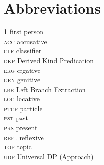 \documentclass[output=paper,
modfonts
]{langscibook}
\begin{document}
	\section*{Abbreviations}
	\begin{multicols}{2}
		\begin{tabbing}
			1\hspace{2em} \= first person \\ \kill 
			\textsc{acc} \> accusative \\ 
			\textsc{clf} \> classifier \\
			\textsc{dkp} \> Derived Kind Predication \\ 
			\textsc{erg} \> ergative \\ 
			\textsc{gen} \> genitive \\ 
			\textsc{lbe} \> Left Branch Extraction \\ 
			\textsc{loc} \> locative \\
			\textsc{ptcp} \> particle \\
			\textsc{pst} \> past \\ 
			\textsc{prs} \> present \\ 
			\textsc{refl} \> reflexive \\ 
			\textsc{top} \> topic \\ 
			\textsc{udp} \> Universal DP (Approach) \\
		\end{tabbing}
	\end{multicols}
	
	{\sloppy
		\printbibliography[heading=subbibliography,notkeyword=this]
	}
\end{document}
